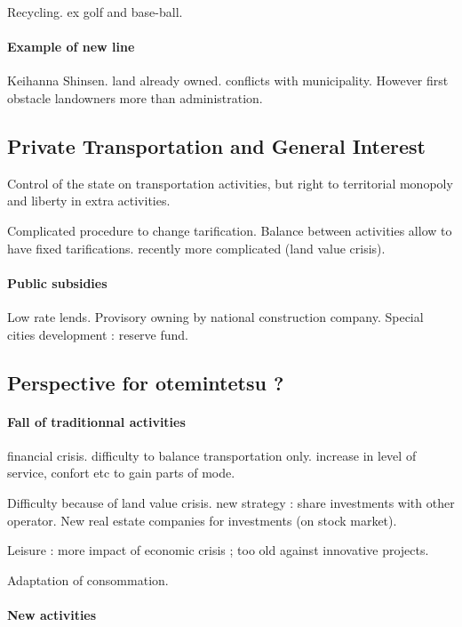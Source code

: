 Recycling. ex golf and base-ball.

\paragraph{Example of new line}

Keihanna Shinsen. land already owned. conflicts with municipality. However first obstacle landowners more than administration.

\subsection{Private Transportation and General Interest}

Control of the state on transportation activities, but right to territorial monopoly and liberty in extra activities.

Complicated procedure to change tarification. Balance between activities allow to have fixed tarifications. recently more complicated (land value crisis).

\paragraph{Public subsidies}

Low rate lends. Provisory owning by national construction company. Special cities development : reserve fund.

\subsection{Perspective for otemintetsu ?}

\paragraph{Fall of traditionnal activities}

financial crisis. difficulty to balance transportation only. increase in level of service, confort etc to gain parts of mode.

Difficulty because of land value crisis. new strategy : share investments with other operator. New real estate companies for investments (on stock market).

Leisure : more impact of economic crisis ; too old against innovative projects.

Adaptation of consommation. 

\paragraph{New activities}

